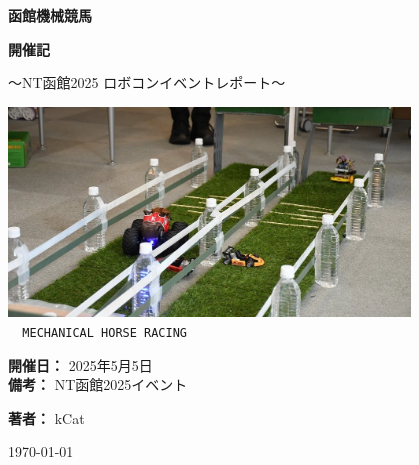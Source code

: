 \begin{titlepage}
    \centering
    
    \vspace*{1.5cm}
    
    {\Huge\textbf{函館機械競馬}}
    
    \vspace{0.5cm}
    
    {\LARGE\textbf{開催記}}
    
    \vspace{0.3cm}
    
    {\large ～NT函館2025 ロボコンイベントレポート～}
    
    \vspace{2cm}
    
    \begin{center}
    \includegraphics[width=0.8\textwidth]{pages/images/title-image.png}\\
    \texttt{
    {\Large 
        {\footnotesize MECHANICAL HORSE RACING}
    }
    }
    \end{center}
    
    \vspace{1.5cm}
    
    {\large 
    \textbf{開催日：} 2025年5月5日\\
    \textbf{備考：} NT函館2025イベント
    }
    
    \vfill
    \vspace{1cm}
    
    {\Large \textbf{著者：} kCat}

    \vspace{0.5cm}
    
    {\large \today}
    
\end{titlepage}